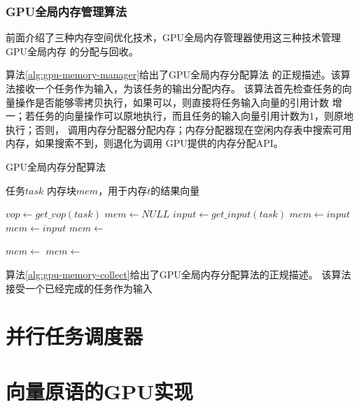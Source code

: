 \subsubsection{GPU全局内存管理算法}

前面介绍了三种内存空间优化技术，GPU全局内存管理器使用这三种技术管理GPU全局内存
的分配与回收。

算法\ref{alg:gpu-memory-manager}给出了GPU全局内存分配算法
的正规描述。该算法接收一个任务作为输入，为该任务的输出分配内存。
该算法首先检查任务的向量操作是否能够零拷贝执行，如果可以，则直接将任务输入向量的引用计数
增一；若任务的向量操作可以原地执行，而且任务的输入向量引用计数为1，则原地执行；否则，
调用内存分配器分配内存；内存分配器现在空闲内存表中搜索可用内存，如果搜索不到，则退化为调用
GPU提供的内存分配API。
\begin{algorithm}
  \caption{GPU全局内存分配算法}
  \label{alg:gpu-memory-manager}
  \begin{algorithmic}[1]
    \Require 任务$task$
    \Ensure 内存块$mem$，用于内存$t$的结果向量

    \State $vop \leftarrow get\_vop(task)$
    \State $mem \leftarrow NULL$
    \State $input \leftarrow get\_input(task)$
    \State {}
    \State $mem \leftarrow input$
    \State $mem \leftarrow input$
    \Else
    \State $mem \leftarrow$ 
    \EndIf
    \State {}
    \EndFunction

    \State $mem \leftarrow$ 
    \State $mem \leftarrow$ 
    \EndIf
    \State {}
    \EndFunction
  \end{algorithmic}
\end{algorithm}

算法\ref{alg:gpu-memory-collect}给出了GPU全局内存分配算法的正规描述。
该算法接受一个已经完成的任务作为输入

\section{并行任务调度器}\label{sec:task-scheduler}

\section{向量原语的GPU实现}\label{sec:vp-driver}

